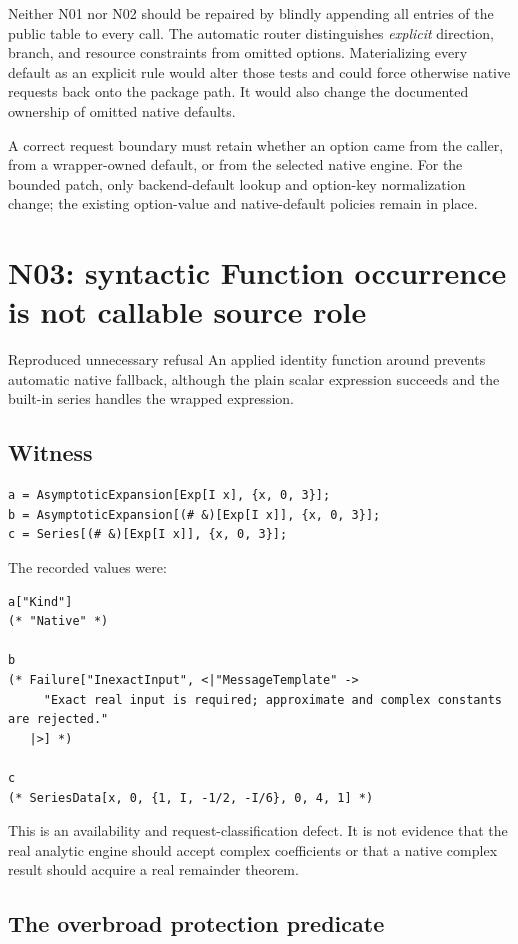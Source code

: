 \documentclass[11pt,letterpaper]{article}
\newcommand{\code}[1]{\texttt{\detokenize{#1}}}
\begin{document}
Neither N01 nor N02 should be repaired by blindly appending all entries of the public \code{Options} table to every call. The automatic
router distinguishes \emph{explicit} direction, branch, and resource
constraints from omitted options. Materializing every default as an explicit
rule would alter those tests and could force otherwise native requests back
onto the package path. It would also change the documented ownership of
omitted native defaults.

A correct request boundary must retain whether an option came from the caller,
from a wrapper-owned default, or from the selected native engine. For the
bounded patch, only backend-default lookup and option-key normalization change;
the existing option-value and native-default policies remain in place.

\section{N03: syntactic Function occurrence is not callable source role}
\begin{findingbox}{Reproduced unnecessary refusal}
An applied identity function around \code{Exp[I x]} prevents automatic native
fallback, although the plain scalar expression succeeds and the built-in
series handles the wrapped expression.
\end{findingbox}

\subsection{Witness}
\begin{lstlisting}
a = AsymptoticExpansion[Exp[I x], {x, 0, 3}];
b = AsymptoticExpansion[(# &)[Exp[I x]], {x, 0, 3}];
c = Series[(# &)[Exp[I x]], {x, 0, 3}];
\end{lstlisting}
The recorded values were:
\begin{lstlisting}
a["Kind"]
(* "Native" *)

b
(* Failure["InexactInput", <|"MessageTemplate" ->
     "Exact real input is required; approximate and complex constants are rejected."
   |>] *)

c
(* SeriesData[x, 0, {1, I, -1/2, -I/6}, 0, 4, 1] *)
\end{lstlisting}
This is an availability and request-classification defect. It is not evidence
that the real analytic engine should accept complex coefficients or that a
native complex result should acquire a real remainder theorem.

\subsection{The overbroad protection predicate}
\end{document}
